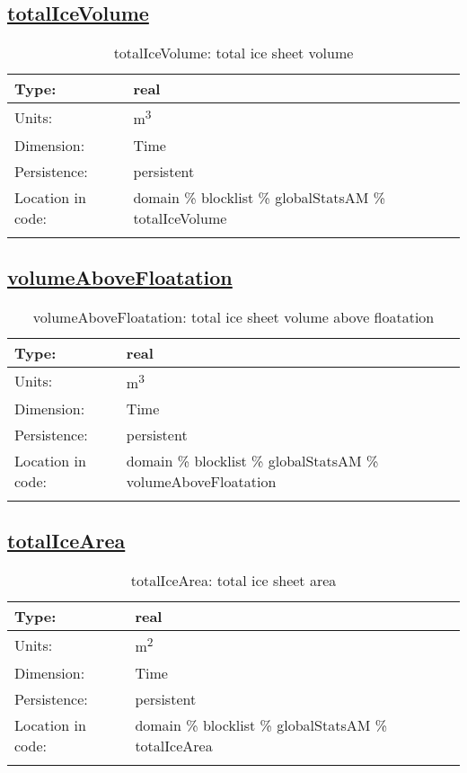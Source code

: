 \subsection[totalIceVolume]{\hyperref[sec:var_tab_globalStatsAM]{totalIceVolume}}
\label{subsec:var_sec_globalStatsAM_totalIceVolume}
\begin{center}
\begin{longtable}{| p{2.0in} | p{4.0in} |}
        \hline 
        Type: & real \\
        \hline 
        Units: & \si{m^3} \\
        \hline 
        Dimension: & Time \\
        \hline 
        Persistence: & persistent \\
        \hline 
         Location in code: & domain \% blocklist \% globalStatsAM \% totalIceVolume \\
         \hline 
    \caption{totalIceVolume: total ice sheet volume}
\end{longtable}
\end{center}
\subsection[volumeAboveFloatation]{\hyperref[sec:var_tab_globalStatsAM]{volumeAboveFloatation}}
\label{subsec:var_sec_globalStatsAM_volumeAboveFloatation}
\begin{center}
\begin{longtable}{| p{2.0in} | p{4.0in} |}
        \hline 
        Type: & real \\
        \hline 
        Units: & \si{m^3} \\
        \hline 
        Dimension: & Time \\
        \hline 
        Persistence: & persistent \\
        \hline 
         Location in code: & domain \% blocklist \% globalStatsAM \% volumeAboveFloatation \\
         \hline 
    \caption{volumeAboveFloatation: total ice sheet volume above floatation}
\end{longtable}
\end{center}
\subsection[totalIceArea]{\hyperref[sec:var_tab_globalStatsAM]{totalIceArea}}
\label{subsec:var_sec_globalStatsAM_totalIceArea}
\begin{center}
\begin{longtable}{| p{2.0in} | p{4.0in} |}
        \hline 
        Type: & real \\
        \hline 
        Units: & \si{m^2} \\
        \hline 
        Dimension: & Time \\
        \hline 
        Persistence: & persistent \\
        \hline 
         Location in code: & domain \% blocklist \% globalStatsAM \% totalIceArea \\
         \hline 
    \caption{totalIceArea: total ice sheet area}
\end{longtable}
\end{center}
